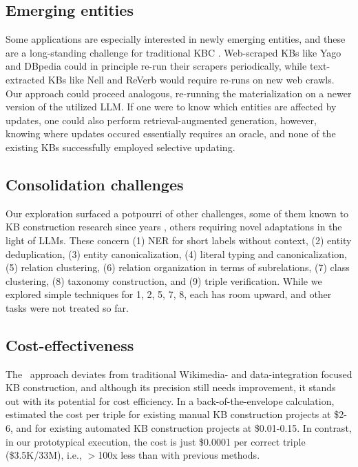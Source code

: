 \subsection{Emerging entities} Some applications are especially interested in newly emerging entities, and these are a long-standing challenge for traditional KBC \cite{knowledge-awakens}. Web-scraped KBs like Yago and DBpedia could in principle re-run their scrapers periodically, while text-extracted KBs like Nell and ReVerb would require re-runs on new web crawls. Our approach could proceed analogous, re-running the materialization on a newer version of the utilized LLM. If one were to know which entities are affected by updates, one could also perform retrieval-augmented generation, however, knowing where updates occured essentially requires an oracle, and none of the existing KBs successfully employed selective updating.

\subsection{Consolidation challenges} Our exploration surfaced a potpourri of other challenges, some of them known to KB construction research since years \cite{machine-knowledge}, others requiring novel adaptations in the light of LLMs. These concern (1) NER for short labels without context, (2) entity deduplication, (3) entity canonicalization, (4) literal typing and canonicalization, (5) relation clustering, (6) relation organization in terms of subrelations, (7) class clustering, (8) taxonomy construction, and (9) triple verification. While we explored simple techniques for 1, 2, 5, 7, 8, each has room upward, and other tasks were not treated so far.

\subsection{Cost-effectiveness} The \ourkb\ approach deviates from traditional Wikimedia- and data-integration focused KB construction, and although its precision still needs improvement, it stands out with its potential for cost efficiency. In a back-of-the-envelope calculation,
\citet{paulheim2018much} estimated the cost per triple for existing manual KB construction projects at \$2-6, and for existing automated KB construction projects at \$0.01-0.15. In contrast, in our prototypical execution, the cost is just \$0.0001 per correct triple (\$3.5K/33M), i.e., $>$100x less than with previous methods.


